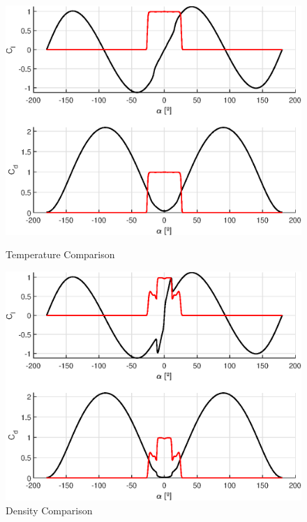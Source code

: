 \begin{figure}[!htb]
	\centering
	\begin{minipage}{0.3\textwidth}
		\centering
		\includegraphics[width=\textwidth]{Figures/background/aero/aero_model_1e4.eps}
		\caption{Temperature Comparison}
		\label{fig:aero_model_1e4}
	\end{minipage}
	\hfill
	\begin{minipage}{0.3\textwidth}
		\centering
		\includegraphics[width=\textwidth]{Figures/background/aero/aero_model_1e5.eps}
		\caption{Density Comparison}
		\label{fig:aero_model_1e5}
	\end{minipage}
    \hfill
    \begin{minipage}{0.3\textwidth}

\end{minipage}
\end{figure}
